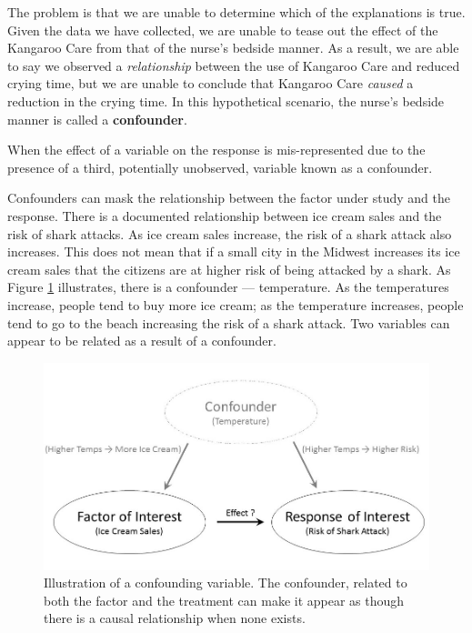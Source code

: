 \documentclass[]{book}
\theoremstyle{definition}
\theoremstyle{definition}
\theoremstyle{remark}
\let\BeginKnitrBlock\begin \let\EndKnitrBlock\end
\begin{document}
The problem is that we are unable to determine which of the explanations
is true. Given the data we have collected, we are unable to tease out
the effect of the Kangaroo Care from that of the nurse's bedside manner.
As a result, we are able to say we observed a \emph{relationship}
between the use of Kangaroo Care and reduced crying time, but we are
unable to conclude that Kangaroo Care \emph{caused} a reduction in the
crying time. In this hypothetical scenario, the nurse's bedside manner
is called a \textbf{confounder}.

\BeginKnitrBlock{definition}[Confounding]
\protect\hypertarget{def:defn-confounding}{}{\label{def:defn-confounding}
{} }When the effect of a variable on the
response is mis-represented due to the presence of a third, potentially
unobserved, variable known as a confounder.
\EndKnitrBlock{definition}

Confounders can mask the relationship between the factor under study and
the response. There is a documented relationship between ice cream sales
and the risk of shark attacks. As ice cream sales increase, the risk of
a shark attack also increases. This does not mean that if a small city
in the Midwest increases its ice cream sales that the citizens are at
higher risk of being attacked by a shark. As Figure
\ref{fig:data-confounding} illustrates, there is a confounder ---
temperature. As the temperatures increase, people tend to buy more ice
cream; as the temperature increases, people tend to go to the beach
increasing the risk of a shark attack. Two variables can appear to be
related as a result of a confounder.

\begin{figure}

{\centering \includegraphics[width=0.8\linewidth]{./images/Data-Confounding} 

}

\caption{Illustration of a confounding variable. The confounder, related to both the factor and the treatment can make it appear as though there is a causal relationship when none exists.}\label{fig:data-confounding}
\end{figure}
\end{document}
